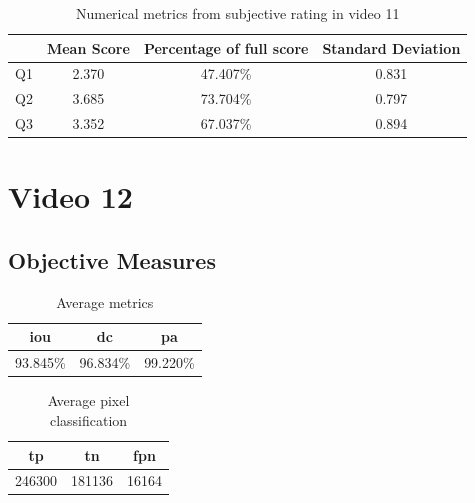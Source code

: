 \begin{table}[H]
    \centering
    \begin{tabular}{|c|c c c|} 
        \hline
           & \textbf{Mean Score} & \textbf{Percentage of full score} & \textbf{Standard Deviation} \\ [0.5ex] 
        \hline
        Q1 & 2.370 & 47.407\% & 0.831 \\ [1ex] 
        Q2 & 3.685 & 73.704\% & 0.797 \\ [1ex] 
        Q3 & 3.352 & 67.037\% & 0.894 \\ [1ex] 
        \hline
    \end{tabular}
    \caption{Numerical metrics from subjective rating in video 11}
    \label{tab:numerical_subj_vid11}
\end{table}




\section{Video 12}
\subsection{Objective Measures}

\begin{minipage}[c]{0.475\textwidth}
\begin{table}[H]
    \centering
    \begin{tabular}{||c c c||} 
        \hline
        \acrshort{iou} & \acrshort{dc} & \acrshort{pa} \\ [0.5ex] 
        \hline\hline
        93.845\% & 96.834\% & 99.220\% \\ [1ex] 
        \hline
    \end{tabular}
    \caption{Average metrics}
    \label{tab:metrics_video_12}
\end{table}
\end{minipage}
\begin{minipage}[c]{0.475\textwidth}
\begin{table}[H]
    \centering
    \begin{tabular}{||c c c||} 
        \hline
        \acrshort{tp} & \acrshort{tn} & \acrshort{fpn} \\ [0.5ex] 
        \hline\hline
        246300 & 181136 & 16164 \\ [1ex] 
        \hline
    \end{tabular}
    \caption{Average pixel classification}
    \label{tab:pixels_video_12}
\end{table}
\end{minipage}

